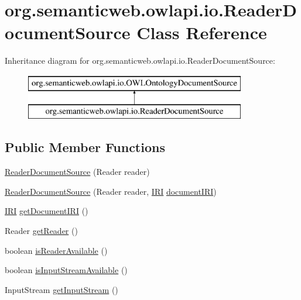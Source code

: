 \hypertarget{classorg_1_1semanticweb_1_1owlapi_1_1io_1_1_reader_document_source}{\section{org.\-semanticweb.\-owlapi.\-io.\-Reader\-Document\-Source Class Reference}
\label{classorg_1_1semanticweb_1_1owlapi_1_1io_1_1_reader_document_source}
}
Inheritance diagram for org.\-semanticweb.\-owlapi.\-io.\-Reader\-Document\-Source\-:\begin{figure}[H]
\begin{center}
\leavevmode
\includegraphics[height=2.000000cm]{classorg_1_1semanticweb_1_1owlapi_1_1io_1_1_reader_document_source}
\end{center}
\end{figure}
\subsection*{Public Member Functions}
\begin{DoxyCompactItemize}
\item 
\hyperlink{classorg_1_1semanticweb_1_1owlapi_1_1io_1_1_reader_document_source_ab7a24560e8a6089f250f539aaec9df36}{Reader\-Document\-Source} (Reader reader)
\item 
\hyperlink{classorg_1_1semanticweb_1_1owlapi_1_1io_1_1_reader_document_source_a224e0fcd2269e366e4327a6434f708a6}{Reader\-Document\-Source} (Reader reader, \hyperlink{classorg_1_1semanticweb_1_1owlapi_1_1model_1_1_i_r_i}{I\-R\-I} \hyperlink{classorg_1_1semanticweb_1_1owlapi_1_1io_1_1_reader_document_source_ace78abe4870c84ff075477da9c242475}{document\-I\-R\-I})
\item 
\hyperlink{classorg_1_1semanticweb_1_1owlapi_1_1model_1_1_i_r_i}{I\-R\-I} \hyperlink{classorg_1_1semanticweb_1_1owlapi_1_1io_1_1_reader_document_source_a33a92ce9df110954bb7594c3fef40bee}{get\-Document\-I\-R\-I} ()
\item 
Reader \hyperlink{classorg_1_1semanticweb_1_1owlapi_1_1io_1_1_reader_document_source_a2a80126be7470ff1ba03d99b67ee1752}{get\-Reader} ()
\item 
boolean \hyperlink{classorg_1_1semanticweb_1_1owlapi_1_1io_1_1_reader_document_source_a8a55659069af4ef053ff3c3e972b11ab}{is\-Reader\-Available} ()
\item 
boolean \hyperlink{classorg_1_1semanticweb_1_1owlapi_1_1io_1_1_reader_document_source_aaed6176262e6c2a779f9c97d08fb8b60}{is\-Input\-Stream\-Available} ()
\item 
Input\-Stream \hyperlink{classorg_1_1semanticweb_1_1owlapi_1_1io_1_1_reader_document_source_a55429dd5f0aa07bfa820be09720a4386}{get\-Input\-Stream} ()
\end{DoxyCompactItemize}

